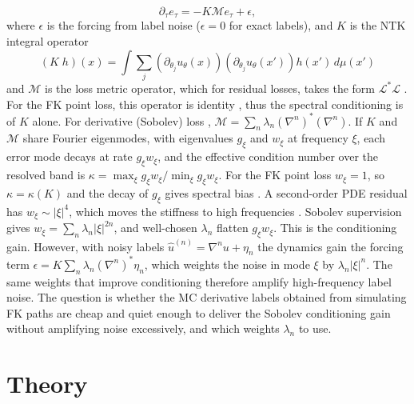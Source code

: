 \documentclass[english]{article}
\begin{document}
\begin{equation}\label{eq:gf}
    \partial_\tau e_\tau = -K\mathcal{M}e_\tau + \epsilon,
\end{equation}
where $\epsilon$ is the forcing from label noise ($\epsilon=0$ for exact labels), and $K$ is the NTK integral operator \cite{jacot2018ntk}
\begin{equation}
    (K\;h)(x)= \int\sum_j(\partial_{\theta_j}u_{\theta}(x))(\partial_{\theta_j}u_{\theta}(x'))h(x')\,d\mu(x')
\end{equation}
and $\mathcal{M}$ is the loss metric operator, which for residual losses, takes the form $\mathcal{L}^*\mathcal{L}$ \cite{deryck2024operator}. For the FK point loss, this operator is identity \cite{tepakbong2026taming}, thus the spectral conditioning is of $K$ alone. For derivative (Sobolev) loss \cite{czarnecki2017sobolev,lu2022sobolev}, $\mathcal{M} = \sum_n \lambda_n (\nabla^n)^*(\nabla^n)$. If $K$ and $\mathcal{M}$ share Fourier eigenmodes, with eigenvalues $g_\xi$ and $w_\xi$ at frequency $\xi$, each error mode decays at rate $g_\xi w_\xi$, and the effective condition number over the resolved band is $\kappa = \max_\xi g_\xi w_\xi / \min_\xi g_\xi w_\xi$. For the FK point loss $w_\xi = 1$, so $\kappa = \kappa(K)$ and the decay of $g_\xi$ gives spectral bias \cite{rahaman2019spectral,wang2022ntk}. A second-order PDE residual has $w_\xi \sim |\xi|^4$, which moves the stiffness to high frequencies \cite{deryck2024operator}. Sobolev supervision gives $w_\xi = \sum_n \lambda_n |\xi|^{2n}$, and well-chosen $\lambda_n$ flatten $g_\xi w_\xi$. This is the conditioning gain. However, with noisy labels $\hat u^{(n)} = \nabla^n u + \eta_n$ the dynamics gain the forcing term $\epsilon = K\sum_n \lambda_n (\nabla^n)^*\eta_n$, which weights the noise in mode $\xi$ by $\lambda_n |\xi|^n$. The same weights that improve conditioning therefore amplify high-frequency label noise. The question is whether the MC derivative labels obtained from simulating FK paths are cheap and quiet enough to deliver the Sobolev conditioning gain without amplifying noise excessively, and which weights $\lambda_n$ to use.

\section{Theory}
\end{document}
